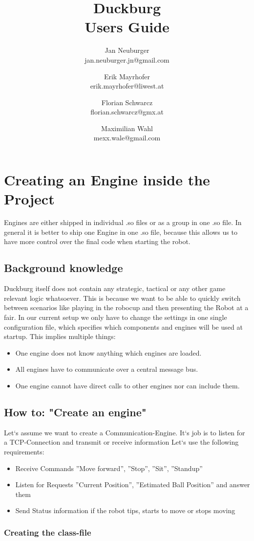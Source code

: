 \documentclass[12pt,a4paper]{article}
\author{    
    Jan Neuburger \\
    jan.neuburger.jn@gmail.com
    \and
    Erik Mayrhofer \\
    erik.mayrhofer@liwest.at
    \and
    Florian Schwarcz \\
    florian.schwarcz@gmx.at
    \and
    Maximilian Wahl \\
    mexx.wale@gmail.com
    }
\title{Duckburg\\[0.2em]Users Guide}
\begin{document}
\maketitle
\newpage
\tableofcontents
\newpage
\section{Creating an Engine inside the Project}
Engines are either shipped in individual .so files or as a group in one .so file.
In general it is better to ship one Engine in one .so file, because this allows
us to have more control over the final code when starting the robot.
\subsection{Background knowledge}
Duckburg itself does not contain any strategic, tactical or any other game
relevant logic whatsoever. 
This is because we want to be able to quickly switch between scenarios like
playing in the robocup and then presenting the Robot at a fair. 
In our current setup we only have to change the settings in one single 
configuration file, which specifies which components and engines will be used
at startup.
This implies multiple things:
\begin{itemize}
    \item One engine does not know anything which engines are loaded.
    \item All engines have to communicate over a central message bus.
    \item One engine cannot have direct calls to other engines nor can include them.
\end{itemize} 
\subsection{How to: "Create an engine"}
Let`s assume we want to create a Communication-Engine.
It`s job is to listen for a TCP-Connection and transmit or receive information
Let`s use the following requirements:
\begin{itemize}
    \item Receive Commands ''Move forward'', ''Stop'', ''Sit'', ''Standup''
    \item Listen for Requests ''Current Position'', ''Estimated Ball Position'' and answer them
    \item Send Status information if the robot tips, starts to move or stops moving
\end{itemize}
\subsubsection{Creating the class-file}
\end{document}
